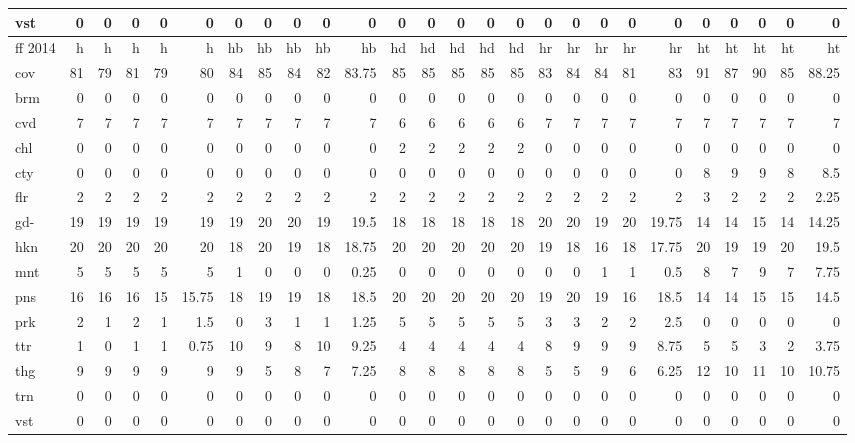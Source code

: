 \begin{center}
\begin{tabular}{lrrrrrrrrrrrrrrrrrrrrrrrrr}
vst & 0 & 0 & 0 & 0 & 0 & 0 & 0 & 0 & 0 & 0 & 0 & 0 & 0 & 0 & 0 & 0 & 0 & 0 & 0 & 0 & 0 & 0 & 0 & 0 & 0\\
\hline
ff 2014 & h & h & h & h & h & hb & hb & hb & hb & hb & hd & hd & hd & hd & hd & hr & hr & hr & hr & hr & ht & ht & ht & ht & ht\\
\hline
cov & 81 & 79 & 81 & 79 & 80 & 84 & 85 & 84 & 82 & 83.75 & 85 & 85 & 85 & 85 & 85 & 83 & 84 & 84 & 81 & 83 & 91 & 87 & 90 & 85 & 88.25\\
brm & 0 & 0 & 0 & 0 & 0 & 0 & 0 & 0 & 0 & 0 & 0 & 0 & 0 & 0 & 0 & 0 & 0 & 0 & 0 & 0 & 0 & 0 & 0 & 0 & 0\\
cvd & 7 & 7 & 7 & 7 & 7 & 7 & 7 & 7 & 7 & 7 & 6 & 6 & 6 & 6 & 6 & 7 & 7 & 7 & 7 & 7 & 7 & 7 & 7 & 7 & 7\\
chl & 0 & 0 & 0 & 0 & 0 & 0 & 0 & 0 & 0 & 0 & 2 & 2 & 2 & 2 & 2 & 0 & 0 & 0 & 0 & 0 & 0 & 0 & 0 & 0 & 0\\
cty & 0 & 0 & 0 & 0 & 0 & 0 & 0 & 0 & 0 & 0 & 0 & 0 & 0 & 0 & 0 & 0 & 0 & 0 & 0 & 0 & 8 & 9 & 9 & 8 & 8.5\\
flr & 2 & 2 & 2 & 2 & 2 & 2 & 2 & 2 & 2 & 2 & 2 & 2 & 2 & 2 & 2 & 2 & 2 & 2 & 2 & 2 & 3 & 2 & 2 & 2 & 2.25\\
gd- & 19 & 19 & 19 & 19 & 19 & 19 & 20 & 20 & 19 & 19.5 & 18 & 18 & 18 & 18 & 18 & 20 & 20 & 19 & 20 & 19.75 & 14 & 14 & 15 & 14 & 14.25\\
hkn & 20 & 20 & 20 & 20 & 20 & 18 & 20 & 19 & 18 & 18.75 & 20 & 20 & 20 & 20 & 20 & 19 & 18 & 16 & 18 & 17.75 & 20 & 19 & 19 & 20 & 19.5\\
mnt & 5 & 5 & 5 & 5 & 5 & 1 & 0 & 0 & 0 & 0.25 & 0 & 0 & 0 & 0 & 0 & 0 & 0 & 1 & 1 & 0.5 & 8 & 7 & 9 & 7 & 7.75\\
pns & 16 & 16 & 16 & 15 & 15.75 & 18 & 19 & 19 & 18 & 18.5 & 20 & 20 & 20 & 20 & 20 & 19 & 20 & 19 & 16 & 18.5 & 14 & 14 & 15 & 15 & 14.5\\
prk & 2 & 1 & 2 & 1 & 1.5 & 0 & 3 & 1 & 1 & 1.25 & 5 & 5 & 5 & 5 & 5 & 3 & 3 & 2 & 2 & 2.5 & 0 & 0 & 0 & 0 & 0\\
ttr & 1 & 0 & 1 & 1 & 0.75 & 10 & 9 & 8 & 10 & 9.25 & 4 & 4 & 4 & 4 & 4 & 8 & 9 & 9 & 9 & 8.75 & 5 & 5 & 3 & 2 & 3.75\\
thg & 9 & 9 & 9 & 9 & 9 & 9 & 5 & 8 & 7 & 7.25 & 8 & 8 & 8 & 8 & 8 & 5 & 5 & 9 & 6 & 6.25 & 12 & 10 & 11 & 10 & 10.75\\
trn & 0 & 0 & 0 & 0 & 0 & 0 & 0 & 0 & 0 & 0 & 0 & 0 & 0 & 0 & 0 & 0 & 0 & 0 & 0 & 0 & 0 & 0 & 0 & 0 & 0\\
vst & 0 & 0 & 0 & 0 & 0 & 0 & 0 & 0 & 0 & 0 & 0 & 0 & 0 & 0 & 0 & 0 & 0 & 0 & 0 & 0 & 0 & 0 & 0 & 0 & 0\\

\end{tabular}
\end{center}
